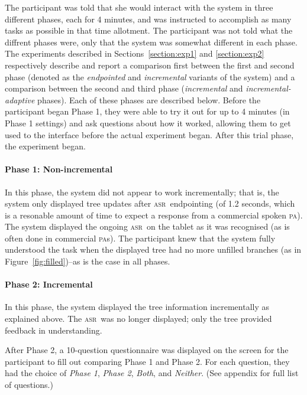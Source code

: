\documentclass[11pt]{article}
\newcommand{\asr}[0]{\textsc{asr}}
\newcommand{\pa}[0]{\textsc{pa}}
\begin{document}
The participant was told that she would interact with the system in three different phases, each for 4 minutes, and was instructed to accomplish as many tasks as possible in that time allotment. The participant was not told what the diffrent phases were, only that the system was somewhat different in each phase. The experiments described in Sections~\ref{section:exp1} and \ref{section:exp2} respectively describe and report a comparison first between the first and second phase (denoted as the \emph{endpointed} and \emph{incremental} variants of the system) and a comparison between the second and third phase (\emph{incremental} and \emph{incremental-adaptive} phases). Each of these phases are described below. Before the participant began Phase 1, they were able to try it out for up to 4 minutes (in Phase 1 settings) and ask questions about how it worked, allowing them to get used to the interface before the actual experiment began. After this trial phase, the experiment began.

\paragraph{Phase 1: Non-incremental} In this phase, the system did not appear to work incrementally; that is, the system only displayed tree updates after \asr\ endpointing (of 1.2 seconds, which is a resonable amount of time to expect a response from a commercial spoken \pa). The system displayed the ongoing \asr\ on the tablet as it was recognised (as is often done in commercial \pa s). The participant knew that the system fully understood the task when the displayed tree had no more unfilled branches (as in Figure~\ref{fig:filled})--as is the case in all phases. 

\paragraph{Phase 2: Incremental} In this phase, the system displayed the tree information incrementally as explained above. The \asr\ was no longer displayed; only the tree provided feedback in understanding. 

After Phase 2, a 10-question questionnaire was displayed on the screen for the participant to fill out comparing Phase 1 and Phase 2. For each question, they had the choice of \emph{Phase 1}, \emph{Phase 2}, \emph{Both}, and \emph{Neither}. (See appendix for full list of questions.) 
\end{document}
